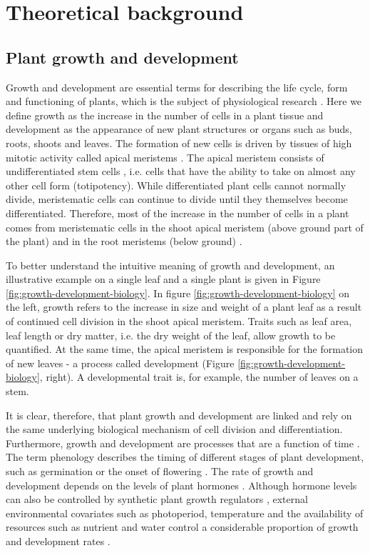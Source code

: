 \section{Theoretical background}
\subsection{Plant growth and development}

Growth and development are essential terms for describing the life cycle, form and functioning of plants, which is the subject of physiological research \citep{leopold_plant_1964}. Here we define growth as the increase in the number of cells in a plant tissue and development as the appearance of new plant structures or organs such as buds, roots, shoots and leaves. The formation of new cells is driven by tissues of high mitotic activity called apical meristems \citep{sinnott_growth_1939}. The apical meristem consists of undifferentiated stem cells \citep{bowman_formation_2000}, i.e. cells that have the ability to take on almost any other cell form (totipotency). While differentiated plant cells cannot normally divide, meristematic cells can continue to divide until they themselves become differentiated. Therefore, most of the increase in the number of cells in a plant comes from meristematic cells in the shoot apical meristem (above ground part of the plant) and in the root meristems (below ground) \citep{kerstetter_shoot_1997}.

To better understand the intuitive meaning of growth and development, an illustrative example on a single leaf and a single plant is given in Figure \ref{fig:growth-development-biology}. In figure \ref{fig:growth-development-biology} on the left, growth refers to the increase in size and weight of a plant leaf as a result of continued cell division in the shoot apical meristem. Traits such as leaf area, leaf length or dry matter, i.e. the dry weight of the leaf, allow growth to be quantified. At the same time, the apical meristem is responsible for the formation of new leaves - a process called development (Figure \ref{fig:growth-development-biology}, right). A developmental trait is, for example, the number of leaves on a stem.

It is clear, therefore, that plant growth and development are linked and rely on the same underlying biological mechanism of cell division and differentiation. Furthermore, growth and development are processes that are a function of time \citep{prusinkiewicz_modeling_2004}. The term phenology describes the timing of different stages of plant development, such as germination or the onset of flowering \citep{piao_plant_2019}. The rate of growth and development depends on the levels of plant hormones \citep{shani_role_2006}. Although hormone levels can also be controlled by synthetic plant growth regulators \citep{gaspar_plant_1996}, external environmental covariates such as photoperiod, temperature \citep{porter_temperatures_1999} and the availability of resources such as nutrient and water control a considerable proportion of growth and development rates \citep{masle_competition_1985,korner_paradigm_2015}.

